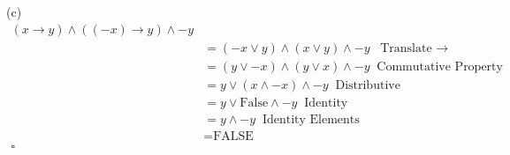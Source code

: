\documentclass[12pt]{article}
\begin{document}
\vspace{0.25in}
(c) 
\[
\begin{aligned} 
(x \rightarrow y) \wedge ((-x) \rightarrow y) \wedge -y\\
&=  (-x \vee y) \wedge ( x\vee y) \wedge -y\;\;  \mbox{Translate $\rightarrow$} \\
&= (y \vee -x) \wedge (y\vee x) \wedge -y \;\; \mbox{Commutative Property} \\ 
&= y \vee (x \wedge -x) \wedge -y \;\; \mbox{Distributive} \\
&= y \vee \mbox{False} \wedge -y \;\; \mbox{Identity} \\
&= y \wedge -y \;\; \mbox{Identity Elements} \\
&= \mbox{FALSE} \\
\square \\
\end{aligned}
\]
\end{document}
